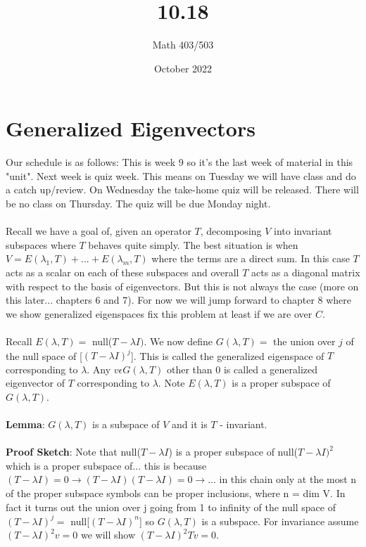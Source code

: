 \documentclass{article}
\title{10.18}
\author{Math 403/503}
\date{October 2022}
\begin{document}
\maketitle

\section{Generalized Eigenvectors}
Our schedule is as follows: This is week 9 so it's the last week of material in this "unit". Next week is quiz week. This means on Tuesday we will have class and do a catch up/review. On Wednesday the take-home quiz will be released. There will be no class on Thursday. The quiz will be due Monday night. \\\\
Recall we have a goal of, given an operator $T$, decomposing $V$ into invariant subspaces where $T$ behaves quite simply. The best situation is when $V = E(\lambda_1, T) + ... + E(\lambda_m, T)$ where the terms are a direct sum. In this case $T$ acts as a scalar on each of these subspaces and overall $T$ acts as a diagonal matrix with respect to the basis of eigenvectors. But this is not always the case (more on this later... chapters 6 and 7). For now we will jump forward to chapter 8 where we show generalized eigenspaces fix this problem at least if we are over $C$. \\\\
Recall $E(\lambda, T) =$ null($T - \lambda I)$. We now define $G(\lambda, T) =$ the union over $j$ of the null space of [$(T-\lambda I)^j$]. This is called the generalized eigenspace of $T$ corresponding to $\lambda$. Any $v \epsilon G(\lambda, T)$ other than $0$ is called a generalized eigenvector of $T$ corresponding to $\lambda$. Note $E(\lambda, T)$ is a proper subspace of $G(\lambda, T)$. \\\\
\textbf{Lemma}: $G(\lambda, T)$ is a subspace of $V$ and it is $T$ - invariant. \\\\
\textbf{Proof Sketch}: Note that null($T - \lambda I$) is a proper subspace of null($T-\lambda I)^2$ which is a proper subspace of... this is because $(T-\lambda I) = 0 \rightarrow (T - \lambda I)(T- \lambda I) = 0 \rightarrow ... $ in this chain only at the most n of the proper subspace symbols can be proper inclusions, where n = dim V. In fact it turns out the union over j going from 1 to infinity of the null space of $(T-\lambda I)^j =$ null[$(T-\lambda I)^n$] so $G(\lambda, T)$ is a subspace. For invariance assume $(T - \lambda I)^2 v = 0$ we will show $(T - \lambda I)^2 Tv = 0$. \\\\
\end{document}

